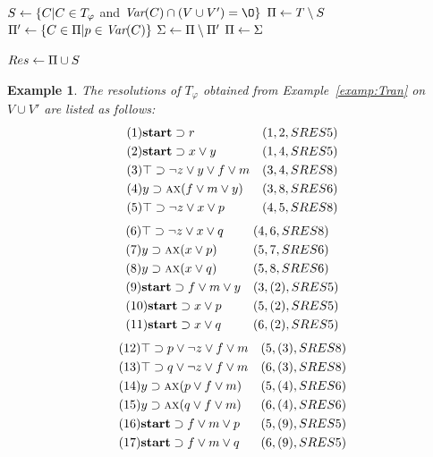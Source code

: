 \documentclass{article}
\newtheorem{example}{Example}
\begin{document}
\begin{algorithm}[!h]
\caption{$\emph{Resolution}(T,V \cup V')$}%
\label{alg:compute:Res}

$S\leftarrow \{C | C\in T_{\varphi}$ and $\Var(C) \cap (V\cup V')= {\O}\}$\;
$\Pi\leftarrow T\setminus S$ \;
 {
    $\Pi'\leftarrow \{C \in \Pi| p\in \textit{Var}(C)\}$ \;
    $\Sigma \leftarrow \Pi \setminus \Pi'$\;
     {
    }
    $\Pi\leftarrow \Sigma$\;
}

$Res\leftarrow \Pi \cup S$\;

\end{algorithm}


\begin{example}\label{examp:Res}
The resolutions of $T_{\varphi}$ obtained from Example~\ref{examp:Tran} on $V\cup V'$ are listed as follows:
\begin{align*}
&(1) \textbf{start} \supset r && (1,2,SRES 5)\\
&(2) \textbf{start} \supset x \vee y && (1,4,SRES 5)\\
&(3) \top \supset \neg z \vee y \vee f \vee m && (3, 4, SRES 8)\\
&(4) y \supset \textsc{a}\textsc{x}(f\vee m\vee y) && (3,8, SRES 6)\\
&(5) \top \supset \neg z \vee x \vee p && (4,5, SRES 8)
\end{align*}
\begin{align*}
&(6) \top \supset \neg z \vee x \vee q && (4,6, SRES 8)\\
&(7) y \supset \textsc{a}\textsc{x}(x\vee p) && (5, 7, SRES 6)\\
&(8) y \supset \textsc{a}\textsc{x}(x\vee q) && (5, 8, SRES 6)\\
&(9) \textbf{start} \supset f\vee m \vee y && (3,(2), SRES 5) \\
&(10) \textbf{start} \supset x \vee p && (5,(2),SRES 5) \\
&(11) \textbf{start} \supset x \vee q && (6,(2), SRES 5)
\end{align*}
\begin{align*}
&(12) \top \supset p \vee \neg z \vee f \vee m && (5,(3), SRES 8)\\
&(13) \top \supset q \vee \neg z \vee f \vee m && (6,(3), SRES 8)\\
&(14) y \supset \textsc{a}\textsc{x}(p \vee f\vee m) && (5, (4), SRES 6) \\
&(15) y \supset \textsc{a}\textsc{x}(q \vee f\vee m) && (6, (4), SRES 6) \\
&(16) \textbf{start} \supset f\vee m \vee p && (5, (9), SRES 5) \\
&(17) \textbf{start} \supset f\vee m \vee q && (6, (9), SRES 5)
\end{align*}
\end{example}
\end{document}
